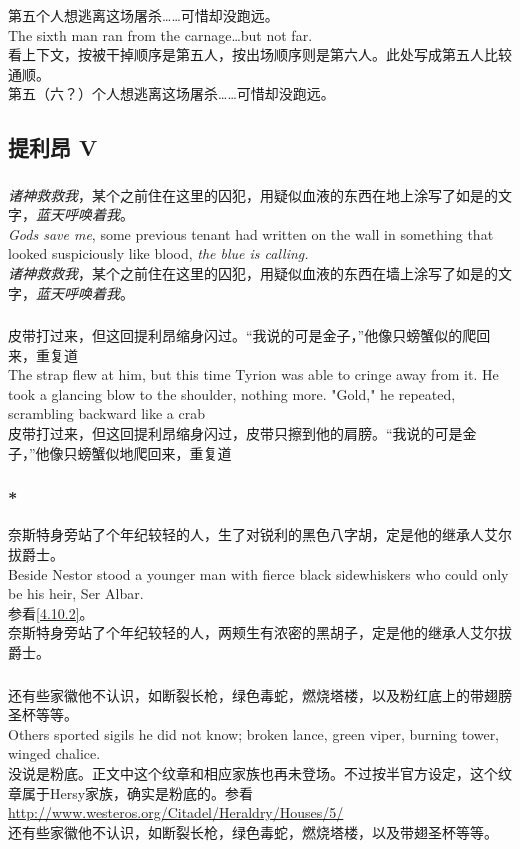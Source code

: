 \documentclass[12pt,a4paper]{article}
\newcommand{\h}[1]{{\color{red}#1}\\}
\newcommand{\la}[1]{{\color{blue}#1}\\}
\begin{document}
\subsubsection{}\la{
	第五个人想逃离这场屠杀……可惜却没跑远。\\
	The sixth man ran from the carnage\ldots but not far. }\h{
	看上下文，按被干掉顺序是第五人，按出场顺序则是第六人。此处写成第五人比较通顺。}
	第五（六？）个人想逃离这场屠杀……可惜却没跑远。
		
\subsection{提利昂 V}
\subsubsection{}\la{
	\emph{诸神救救我}，某个之前住在这里的囚犯，用疑似血液的东西在地上涂写了如是的文字，\emph{蓝天呼唤着我}。\\
	\emph{Gods save me}, some previous tenant had written on the wall in something that looked suspiciously like blood, \emph{the blue is calling.}}
	\emph{诸神救救我}，某个之前住在这里的囚犯，用疑似血液的东西在墙上涂写了如是的文字，\emph{蓝天呼唤着我}。
	
\subsubsection{}\la{
	皮带打过来，但这回提利昂缩身闪过。“我说的可是金子，”他像只螃蟹似的爬回来，重复道\\
	The strap flew at him, but this time Tyrion was able to cringe away from it. He took a glancing blow to the shoulder, nothing more. "Gold," he repeated, scrambling backward like a crab}
	皮带打过来，但这回提利昂缩身闪过，皮带只擦到他的肩膀。“我说的可是金子，”他像只螃蟹似地爬回来，重复道
	
\subsubsection{\color{red}*}\label{1.38.3}\la{
	奈斯特身旁站了个年纪较轻的人，生了对锐利的黑色八字胡，定是他的继承人艾尔拔爵士。\\
	Beside Nestor stood a younger man with fierce black sidewhiskers who could only be his heir, Ser Albar.}\h{
	参看\ref{4.10.2}。}
	奈斯特身旁站了个年纪较轻的人，两颊生有浓密的黑胡子，定是他的继承人艾尔拔爵士。
	
\subsubsection{}\la{
	还有些家徽他不认识，如断裂长枪，绿色毒蛇，燃烧塔楼，以及粉红底上的带翅膀圣杯等等。\\
	Others sported sigils he did not know; broken lance, green viper, burning tower, winged chalice.}\h{
	没说是粉底。正文中这个纹章和相应家族也再未登场。不过按半官方设定，这个纹章属于Hersy家族，确实是粉底的。参看\url{http://www.westeros.org/Citadel/Heraldry/Houses/5/}}
	还有些家徽他不认识，如断裂长枪，绿色毒蛇，燃烧塔楼，以及带翅圣杯等等。
	
\end{document}
